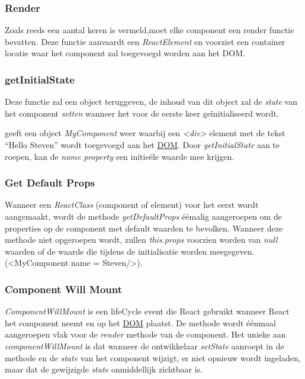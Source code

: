 	\subsubsection{Render}	\label{section:rjsrender}
		
		Zoals reeds een aantal keren is vermeld,moet elke component een render functie bevatten. Deze functie aanvaardt een \emph{ReactElement} en voorziet een container locatie waar het component zal toegevoegd worden aan het DOM.
	
	\subsubsection{getInitialState}
		
		Deze functie zal een object teruggeven, de inhoud van dit object zal de \emph{state} van het component \emph{setten} wanneer het voor de eerste keer geïnitialiseerd wordt.
		
		
		 geeft een object \emph{MyComponent} weer waarbij een \emph{<div>} element met de tekst ``Hello Steven'' wordt toegevoegd aan het \hyperref[dom]{DOM}. Door \emph{getInitialState} aan te roepen, kan de \emph{name property} een initieële waarde mee krijgen.
	
	\subsubsection{Get Default Props}
		
		Wanneer een \emph{ReactClass} (component of element) voor het eerst wordt aangemaakt, wordt de methode \emph{getDefaultProps} éémalig aangeroepen om de properties op de component met default waarden te bevolken. Wanneer deze methode niet opgeroepen wordt, zullen \emph{this.props} voorzien worden van \emph{null} waarden of de waarde die tijdens de initialisatie worden meegegeven. (<MyComponent name = \textquotedbl Steven\textquotedbl />).
	
	\subsubsection{Component Will Mount}
		
		\emph{ComponentWillMount} is een lifeCycle event die React gebruikt wanneer React het component neemt en op het \hyperref[dom]{DOM} plaatst. De methode wordt éénmaal aangeroepen vlak voor de \emph{render} methode van de component. Het unieke aan \emph{componentWillMount} is dat wanneer de ontwikkelaar \emph{setState} aanroept in de methode en de \emph{state} van het component wijzigt, er niet opnieuw wordt ingeladen, maar dat de gewijzigde \emph{state} onmiddellijk zichtbaar is.
	
